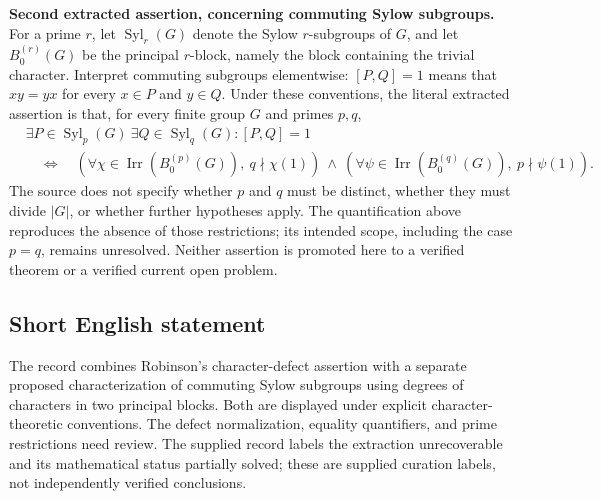 \documentclass[11pt]{article}
\begin{document}
\textbf{Second extracted assertion, concerning commuting Sylow subgroups.}
For a prime \(r\), let \(\operatorname{Syl}_r(G)\) denote the Sylow \(r\)-subgroups of \(G\), and let \(B_0^{(r)}(G)\) be the principal \(r\)-block, namely the block containing the trivial character. Interpret commuting subgroups elementwise: \([P,Q]=1\) means that \(xy=yx\) for every \(x\in P\) and \(y\in Q\). Under these conventions, the literal extracted assertion is that, for every finite group \(G\) and primes \(p,q\),
\[
\begin{aligned}
 &\exists P\in\operatorname{Syl}_p(G)\ \exists Q\in\operatorname{Syl}_q(G):[P,Q]=1\\
 &\quad\Longleftrightarrow\quad
 \left(\forall\chi\in\operatorname{Irr}(B_0^{(p)}(G)),\ q\nmid\chi(1)\right)
 \ \land\
 \left(\forall\psi\in\operatorname{Irr}(B_0^{(q)}(G)),\ p\nmid\psi(1)\right).
\end{aligned}
\]
The source does not specify whether \(p\) and \(q\) must be distinct, whether they must divide \(|G|\), or whether further hypotheses apply. The quantification above reproduces the absence of those restrictions; its intended scope, including the case \(p=q\), remains unresolved. Neither assertion is promoted here to a verified theorem or a verified current open problem.
\subsection{Short English statement}
The record combines Robinson's character-defect assertion with a separate proposed characterization of commuting Sylow subgroups using degrees of characters in two principal blocks. Both are displayed under explicit character-theoretic conventions. The defect normalization, equality quantifiers, and prime restrictions need review. The supplied record labels the extraction unrecoverable and its mathematical status partially solved; these are supplied curation labels, not independently verified conclusions.
\end{document}
